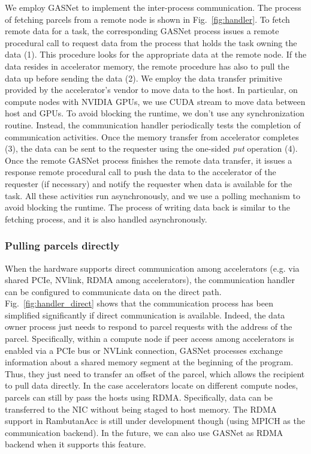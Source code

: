 We employ GASNet to implement the inter-process communication.
The process of fetching parcels from a remote node is shown in Fig.~\ref{fig:handler}.
To fetch remote data for a task, the corresponding GASNet process issues a remote procedural call to request data from the process that holds the task owning the data (1).
This procedure looks for the appropriate data at the remote node.
If the data resides in accelerator memory, the remote procedure has also to pull the data up before sending the data (2).
We employ the data transfer primitive provided by the accelerator's vendor to move data to the host.
In particular, on compute nodes with NVIDIA GPUs, we use CUDA stream to move data between host and GPUs.
To avoid blocking the runtime, we don't use any synchronization routine.
Instead, the communication handler periodically tests the completion of communication activities.
Once the memory transfer from accelerator completes (3), the data can be sent to the requester using the one-sided {\em put} operation (4).
Once the remote GASNet process finishes the remote data transfer, it issues a response remote procedural call to push the data to the accelerator of the requester (if necessary) and notify the requester when data is available for the task.
All these activities run asynchronously, and we use a polling mechanism to avoid blocking the runtime.
The process of writing data back is similar to the fetching process, and it is also handled asynchronously.




\subsubsection{Pulling parcels directly}
When the hardware supports direct communication among accelerators (e.g. via shared PCIe, NVlink, RDMA among accelerators), the communication handler can be configured to communicate data on the direct path.
Fig.~\ref{fig:handler_direct} shows that the communication process has been simplified significantly if direct communication is available.
Indeed, the data owner process just needs to respond to parcel requests with the address of the parcel.
Specifically, within a compute node if peer access among accelerators is enabled via a PCIe bus or NVLink connection, GASNet processes exchange information about a shared memory segment at the beginning of the program. Thus, they just need to transfer an offset of the parcel, which allows the recipient to pull data directly.
In the case accelerators locate on different compute nodes, parcels can still by pass the hosts using RDMA.
Specifically, data can be transferred to the NIC without being staged to host memory.
The RDMA support in RambutanAcc is still under development though (using MPICH as the communication backend).
In the future, we can also use GASNet as RDMA backend when it supports this feature.


